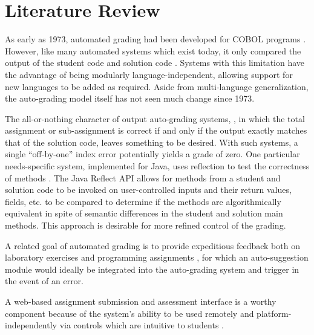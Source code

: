 \section{Literature Review}

As early as 1973, automated grading had been developed for COBOL programs
\cite{aaronson}.  However, like many automated systems which exist today, it
only compared the output of the student code and solution code \cite{pieterse,
gotel, singh, nordquist, edwards, edwards2, sherman}.  Systems with this
limitation have the advantage of being modularly language-independent,
allowing support for new languages to be added as required. Aside from
multi-language generalization, the auto-grading model itself has not seen
much change since 1973.

The all-or-nothing character of output auto-grading systems, \cite{zanden}, in
which the total assignment or sub-assignment is correct if and only if the
output exactly matches that of the solution code, leaves something to be
desired.  With such systems, a single ``off-by-one'' index error potentially
yields a grade of zero.  One particular needs-specific system, implemented for
Java, uses reflection to test the correctness of methods \cite{helmick}. The
Java Reflect API allows for methods from a student and solution code to be
invoked on user-controlled inputs and their return values, fields, etc. to be
compared to determine if the methods are algorithmically equivalent in spite of
semantic differences in the student and solution main methods. This approach is
desirable for more refined control of the grading.

A related goal of automated grading is to provide expeditious feedback both on
laboratory exercises \cite{nordquist} and programming assignments \cite{singh},
for which an auto-suggestion module would ideally be integrated into the
auto-grading system and trigger in the event of an error.


A web-based assignment submission and assessment interface is a worthy
component because of the system's ability to be used remotely and
platform-independently via controls which are intuitive to students \cite{fu,
gotel, edwards2}.

